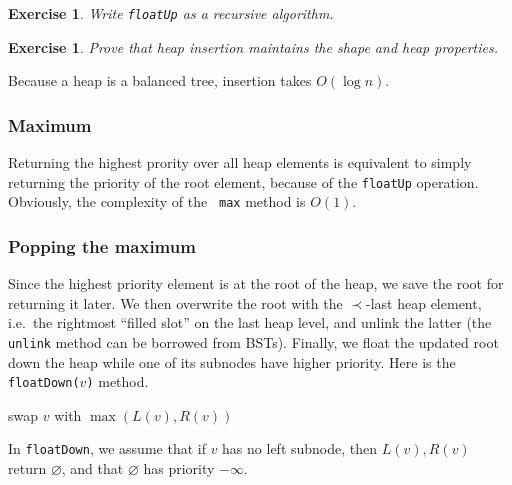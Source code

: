 \documentclass[a4paper]{book}
\theoremstyle{changebreak}                %
\newtheorem{ex}[result]{Exercise}
\begin{document}
\begin{ex}
Write {\tt floatUp} as a recursive algorithm.
\end{ex}

\begin{ex}
Prove that heap insertion maintains the
shape and heap
properties.
\end{ex}

Because a heap is a balanced tree, insertion takes $O(\log n)$.

\subsubsection{Maximum}
Returning the highest prority over all heap
elements is equivalent to simply returning the priority of the root
element, because of the {\tt floatUp} operation. Obviously, the complexity of the {\tt
  max} method is $O(1)$.

\subsubsection{Popping the maximum}
\label{s:search:heap:popmax}
Since the highest priority element is at the
root of the heap, we save the root for returning it
later. We then overwrite the root with the $\prec$-last heap element,
i.e.~the rightmost ``filled slot'' on the last heap
level, and unlink the latter (the
{\tt unlink} method can be borrowed from BSTs). Finally,
we float the updated root down the heap while one of
its subnodes have higher priority. Here is the
{\tt floatDown($v$)} method.
\begin{algorithmic}[1]
  \STATE swap $v$ with $\max(L(v),R(v))$
\ENDWHILE
\end{algorithmic}
In {\tt floatDown}, we assume that if $v$ has no left subnode, then
$L(v),R(v)$ return $\varnothing$, and that $\varnothing$ has priority
$-\infty$.
\end{document}
